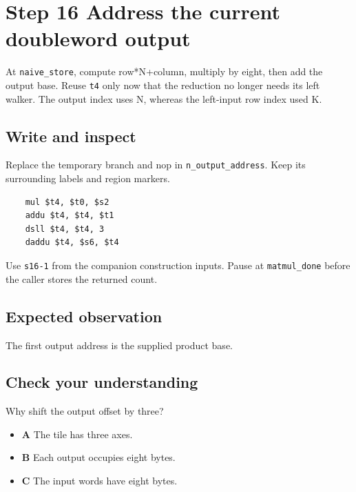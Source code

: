 \section{Step 16 Address the current doubleword output}\label{matmul-s16}

At \texttt{naive\_store}, compute row*N+column, multiply by eight, then add the output base. Reuse \texttt{t4} only now that the reduction no longer needs its left walker. The output index uses N, whereas the left-input row index used K.

\subsection{Write and inspect}
Replace the temporary branch and nop in \texttt{n\_output\_address}. Keep its surrounding labels and region markers.

\begin{verbatim}
    mul $t4, $t0, $s2
    addu $t4, $t4, $t1
    dsll $t4, $t4, 3
    daddu $t4, $s6, $t4
\end{verbatim}
Use \texttt{s16-1} from the companion construction inputs. Pause at \texttt{matmul\_done} before the caller stores the returned count.

\subsection{Expected observation}
The first output address is the supplied product base.

\subsection{Check your understanding}
Why shift the output offset by three?

\begin{itemize}
\item \textbf{A} The tile has three axes.
\item \textbf{B} Each output occupies eight bytes.
\item \textbf{C} The input words have eight bytes.
\end{itemize}
